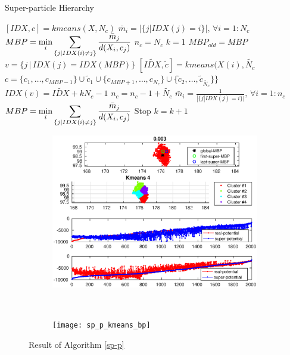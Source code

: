 \documentclass[10pt]{article}
\begin{document}
 \begin{algorithm}
\caption{Super-particle Hierarchy}
\label{sp-p}
\begin{algorithmic}[1]
\State $[IDX,c]=kmeans(X,N_c)$ 
\State $\bar m_i=|\{j | IDX(j)=i\}|,\,\forall i=1:N_c$
\State $MBP=\displaystyle\min_i \displaystyle\sum_{\{j|IDX(i)\neq j\}}\frac{\bar m_j}{d(X_i,c_j)}$ 
\State $n_c=N_c$
\State $k=1$
\State $MBP_{old} = MBP$
\State $v=\{j\,|\,IDX(j)=IDX(MBP)\}$
\State $[\tilde{IDX},\tilde{c}]=kmeans(X(i),\tilde{N_c}$
\State $c=\{c_1,\dots,c_{MBP-1}\}\cup\tilde{c}_1 \cup \{c_{MBP+1},\dots,c_{N_c}\}\cup \{\tilde{c}_2,\dots,\tilde{c}_{\tilde{N_c}}\}\}$
\State $IDX(v)=\tilde{IDX}+kN_c-1$
\State $n_c=n_c-1+\tilde{N_c}$
\State $\bar m_i=\frac{1}{|\{j | IDX(j)=i\}|},\,\forall i=1:n_c$
\State $MBP=\displaystyle\min_i \displaystyle\sum_{\{j|IDX(i)\neq j\}}\frac{\bar m_j}{d(X_i,c_j)}$ 
\State Stop
\EndIf
\State $k=k+1$
\EndWhile
\EndProcedure
\end{algorithmic} 
 \end{algorithm}
\begin{figure}[t!]
\centering
\begin{subfigure}[t]{0.5\textwidth}
\centering
\includegraphics[scale=0.45]{sp_p_kmeans}
\end{subfigure}%
~ 
\begin{subfigure}[t]{0.5\textwidth}
\centering
\texttt{[image: sp\_p\_kmeans\_bp]}
\end{subfigure}
\caption{Result of Algorithm \ref{sp-p}}
\end{figure}
\end{document}
